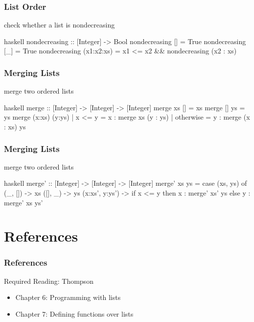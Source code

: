 \documentclass[dvipsnames]{beamer}
\theoremstyle{plain}
\begin{document}
\begin{frame}[fragile]
  \frametitle{List Order}

  \begin{exampleblock}{check whether a list is nondecreasing}
    \begin{pygments}{haskell}
nondecreasing :: [Integer] -> Bool
nondecreasing []         = True
nondecreasing [_]        = True
nondecreasing (x1:x2:xs) =
    x1 <= x2 && nondecreasing (x2 : xs)
    \end{pygments}
  \end{exampleblock}
\end{frame}

\begin{frame}[fragile]
  \frametitle{Merging Lists}

  \begin{exampleblock}{merge two ordered lists}
    \begin{pygments}{haskell}
merge :: [Integer] -> [Integer] -> [Integer]
merge xs     []     = xs
merge []     ys     = ys
merge (x:xs) (y:ys)
  | x <= y    = x : merge xs (y : ys)
  | otherwise = y : merge (x : xs) ys
    \end{pygments}
  \end{exampleblock}
\end{frame}

\begin{frame}[fragile]
  \frametitle{Merging Lists}

  \begin{exampleblock}{merge two ordered lists}
    \begin{pygments}{haskell}
merge' :: [Integer] -> [Integer] -> [Integer]
merge' xs ys =
    case (xs, ys) of
      (_,     [])    -> xs
      ([],    _)     -> ys
      (x:xs', y:ys') -> if x <= y
                            then x : merge' xs' ys
                            else y : merge' xs ys'
    \end{pygments}
  \end{exampleblock}
\end{frame}

\section*{References}

\begin{frame}
  \frametitle{References}

  \begin{block}{Required Reading: Thompson}
    \begin{itemize}
      \item Chapter 6: \alert{Programming with lists}
      \item Chapter 7: \alert{Defining functions over lists}
    \end{itemize}
  \end{block}
\end{frame}
\end{document}
